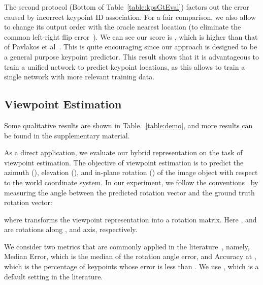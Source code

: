\documentclass[runningheads]{llncs}
\begin{document}
The second protocol (Bottom of Table~\ref{table:kpsGtEval}) factors out the error caused by incorrect keypoint ID association.
For a fair comparison, we also allow~\cite{pavlakos20176} to change its output order with the oracle nearest location (to eliminate the common left-right flip error~\cite{Ronchi_2017_ICCV}).  
We can see our score is , which is  higher than that of Pavlakos et al~\cite{pavlakos20176}. 
This is quite encouraging since our approach is designed to be a general purpose keypoint predictor. 
This result shows that it is advantageous to train a unified network to predict keypoint locations, as this allows to train a single network with more relevant training data.


\subsection{Viewpoint Estimation}
\label{Subsection:Viewpoint:Estimation}

Some qualitative results are shown in Table.~\ref{table:demo}, and more results can be found in the supplementary material.

As a direct application, we evaluate our hybrid representation on the task of viewpoint estimation. The objective of viewpoint estimation is to predict the azimuth (), elevation (), and in-plane rotation () of the image object with respect to the world coordinate system. In our experiment, we follow the conventions~\cite{tulsiani2015viewpoints,su2015render} by measuring the angle between the predicted rotation vector and the ground truth rotation vector:

where  transforms the viewpoint representation  into a rotation matrix. Here ,  and  are rotations along ,  and  axis, respectively. 

We consider two metrics that are commonly applied in the literature~\cite{tulsiani2015viewpoints,pavlakos20176,mousavian20173d,su2015render}, namely, Median Error, which is the median of the rotation angle error, and Accuracy at , which is the percentage of keypoints whose error is less than . We use , which is a default setting in the literature.
\end{document}
